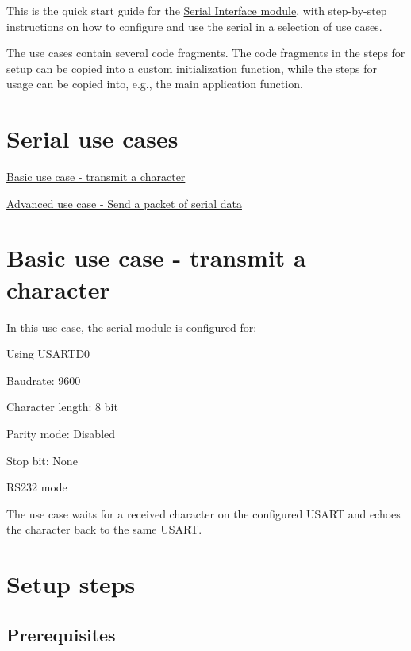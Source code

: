 This is the quick start guide for the \hyperlink{group__serial__group}{Serial Interface module}, with step-\/by-\/step instructions on how to configure and use the serial in a selection of use cases.

The use cases contain several code fragments. The code fragments in the steps for setup can be copied into a custom initialization function, while the steps for usage can be copied into, e.\-g., the main application function.\hypertarget{serial_quickstart_serial_use_cases}{}\section{Serial use cases}\label{serial_quickstart_serial_use_cases}

\begin{DoxyItemize}
\item \hyperlink{serial_quickstart_serial_basic_use_case}{Basic use case -\/ transmit a character}
\item \hyperlink{serial_use_case_1}{Advanced use case -\/ Send a packet of serial data}
\end{DoxyItemize}\hypertarget{serial_quickstart_serial_basic_use_case}{}\section{Basic use case -\/ transmit a character}\label{serial_quickstart_serial_basic_use_case}
In this use case, the serial module is configured for\-:
\begin{DoxyItemize}
\item Using U\-S\-A\-R\-T\-D0
\item Baudrate\-: 9600
\item Character length\-: 8 bit
\item Parity mode\-: Disabled
\item Stop bit\-: None
\item R\-S232 mode
\end{DoxyItemize}

The use case waits for a received character on the configured U\-S\-A\-R\-T and echoes the character back to the same U\-S\-A\-R\-T.\hypertarget{serial_quickstart_serial_basic_use_case_setup}{}\section{Setup steps}\label{serial_quickstart_serial_basic_use_case_setup}
\hypertarget{serial_quickstart_serial_basic_use_case_setup_prereq}{}\subsection{Prerequisites}\label{serial_quickstart_serial_basic_use_case_setup_prereq}

